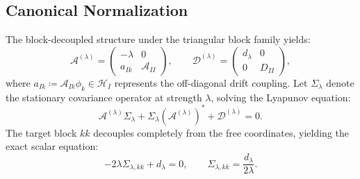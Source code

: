 \documentclass[preprint,12pt]{elsarticle}
\theoremstyle{plain}
\theoremstyle{definition}
\theoremstyle{remark}
\begin{document}
    \subsection{Canonical Normalization}
    \label{sec:setup:calibration}

    The block-decoupled structure under the triangular block family yields:
    \begin{equation}
        \label{eq:block_decoupled_drift_diffusion}
        \mathcal{A}^{(\lambda)}=
    \begin{pmatrix}-\lambda&0\\a_{Ik}&\mathcal{A}_{II}\end{pmatrix},\qquad
        \mathcal{D}^{(\lambda)}=
    \begin{pmatrix}d_\lambda&0\\0&D_{II}\end{pmatrix},
    \end{equation}
    where $a_{Ik} \coloneqq \mathcal{A}_{Ik} \phi_k \in \mathcal{H}_I$ represents the off-diagonal drift coupling.
    Let $\Sigma_\lambda$ denote the stationary covariance operator at strength
    $\lambda$, solving the Lyapunov equation:
    \begin{equation}
        \label{eq:stationary_lyapunov_regularized}
        \mathcal{A}^{(\lambda)}\Sigma_\lambda + \Sigma_\lambda(\mathcal{A}^{(\lambda)})^* + \mathcal{D}^{(\lambda)} = 0.
    \end{equation}
    The target block $kk$ decouples completely from the free coordinates, yielding the exact scalar equation:
    \begin{equation}
        \label{eq:target_scalar_lyapunov}
        -2\lambda\Sigma_{\lambda,kk} + d_\lambda = 0,
        \qquad
        \Sigma_{\lambda,kk} = \frac{d_\lambda}{2\lambda}.
    \end{equation}
\end{document}
